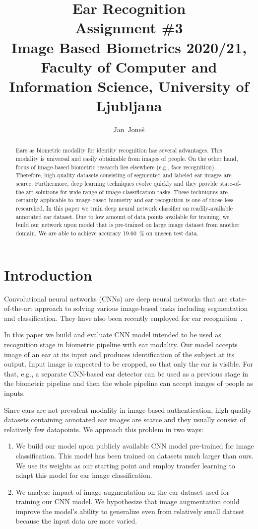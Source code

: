 \documentclass[9pt]{IEEEtran}
\title{\vspace{0ex} %
Ear Recognition
\\ \large{Assignment \#3}\\ \normalsize{Image Based Biometrics 2020/21, Faculty of Computer and Information Science, University of Ljubljana}}
\author{ %
Jan~Joneš
\vspace{-4.0ex}
}
\begin{document}
\maketitle

\begin{abstract}
    Ears as biometric modality for identity recognition has several advantages.
    This modality is universal and easily obtainable from images of people.
    On the other hand, focus of image-based biometric research lies elsewhere (e.g., face recognition).
    Therefore, high-quality datasets consisting of segmented and labeled ear images are scarce.
    Furthermore, deep learning techniques evolve quickly and they provide state-of-the-art solutions for wide range of image classification tasks.
    These techniques are certainly applicable to image-based biometry and ear recognition is one of those less researched.
    In this paper we train deep neural network classifier on readily-available annotated ear dataset.
    Due to low amount of data points available for training, we build our network upon model that is pre-trained on large image dataset from another domain.
    We are able to achieve accuracy 19.60~\% on unseen test data.
\end{abstract}

\section{Introduction}

Convolutional neural networks (CNNs) are deep neural networks that are state-of-the-art approach to solving various image-based tasks including segmentation and classification.
They have also been recently employed for ear recognition~\cite{emersic2017}.

In this paper we build and evaluate CNN model intended to be used as recognition stage in biometric pipeline with ear modality.
Our model accepts image of an ear at its input and produces identification of the subject at its output.
Input image is expected to be cropped, so that only the ear is visible.
For that, e.g., a separate CNN-based ear detector can be used as a previous stage in the biometric pipeline and then the whole pipeline can accept images of people as inputs.

Since ears are not prevalent modality in image-based authentication, high-quality datasets containing annotated ear images are scarce and they usually consist of relatively few datapoints.
We approach this problem in two ways:
\begin{enumerate}
    \item We build our model upon publicly available CNN model pre-trained for image classification.
          This model has been trained on datasets much larger than ours.
          We use its weights as our starting point and employ transfer learning to adapt this model for ear image classification.
    \item We analyze impact of image augmentation on the ear dataset used for training our CNN model.
          We hypothesize that image augmentation could improve the model's ability to generalize even from relatively small dataset because the input data are more varied.
\end{enumerate}
\end{document}
